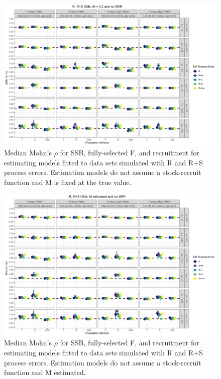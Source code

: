 \documentclass[
  12pt,
]{article}
\begin{document}
\begin{landscape}
\begin{figure}
\caption{Median Mohn's $\rho$ for SSB, fully-selected F, and recruitment for estimating models fitted to data sets simulated with R and R+S process errors.  Estimation models do not assume a stock-recruit function and M is fixed at the true value.}\label{naa_om_em_R_MF_mohns_rho}
\begin{center}
\includegraphics[width = \textwidth]{naa_om_mohns_rho_R_MF.png}
\end{center}
\end{figure}
\end{landscape}

\begin{landscape}
\begin{figure}
\caption{Median Mohn's $\rho$ for SSB, fully-selected F, and recruitment for estimating models fitted to data sets simulated with R and R+S process errors.  Estimation models do not assume a stock-recruit function and M estimated.}\label{naa_om_em_R_ME_mohns_rho}
\begin{center}
\includegraphics[width = \textwidth]{naa_om_mohns_rho_R_ME.png}
\end{center}
\end{figure}
\end{landscape}
\end{document}
